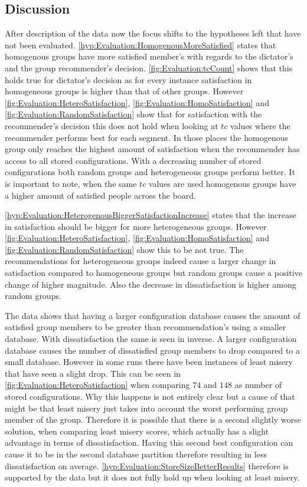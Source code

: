 \subsection{Discussion}

After description of the data now the focus shifts to the hypotheses left that have not been evaluated.
\autoref{hyp:Evaluation:HomogenousMoreSatisfied} states that homogenous groups have more satisfied member's with regards to the dictator's and the group recommender's decision. \autoref{fig:Evaluation:tcCount} shows that this holds true for dictator's decision as for every instance satisfaction in homogeneous groups is higher than that of other groups. However \autoref{fig:Evaluation:HeteroSatisfaction}, \autoref{fig:Evaluation:HomoSatisfaction} and \autoref{fig:Evaluation:RandomSatisfaction} show that for satisfaction with the recommender's decision this does not hold when looking at $tc$ values where the recommender performs best for each  segment. In those places the homogenous group only reaches the highest amount of satisfaction when the recommender has access to all stored configurations. With a decreasing number of stored configurations both random groups and heterogeneous groups perform better. It is important to note, when the same $tc$ values are used homogenous groups have a higher amount of satisfied people across the board.

\autoref{hyp:Evaluation:HeterogenousBiggerSatisfactionIncrease} states that the increase in satisfaction should be bigger for more heterogeneous groups. However \autoref{fig:Evaluation:HeteroSatisfaction}, \autoref{fig:Evaluation:HomoSatisfaction} and \autoref{fig:Evaluation:RandomSatisfaction} show this to be not true. The recommendations for heterogeneous groups indeed cause a larger change in satisfaction compared to homogeneous groups but random groups cause a positive change of higher magnitude. Also the decrease in dissatisfaction is higher among random groups.

The data shows that having a larger configuration database causes the amount of satisfied group members to be greater than recommendation's using a smaller database. With dissatisfaction the same is seen in inverse. A larger configuration database causes the number of dissatisfied group members to drop compared to a small database. However in some runs there have been instances of least misery that have seen a slight drop. This can be seen in \autoref{fig:Evaluation:HeteroSatisfaction} when comparing $74$ and $148$ as number of stored configurations. Why this happens is not entirely clear but a cause of that might be that least misery just takes into account the worst performing group member of the group. Therefore it is possible that there is a second slightly worse solution, when comparing least misery scores, which actually has a slight advantage in terms of dissatisfaction. Having this second best configuration can cause it to be in the second database partition therefore resulting in less dissatisfaction on average. \autoref{hyp:Evaluation:StoreSizeBetterResults} therefore is supported by the data but it does not fully hold up when looking at least misery.

